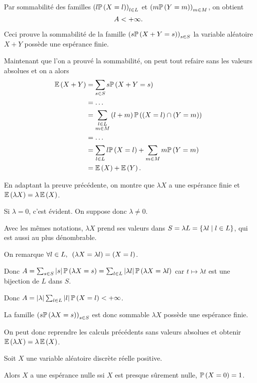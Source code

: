 \begin{dem}
Par sommabilité des familles \(\left(l\mathbb{P}\left(X=l\right)\right)_{l\in L}\) et \(\left(m\mathbb{P}\left(Y=m\right)\right)_{m\in M}\), on obtient \[A<+\infty.\]

Ceci prouve la sommabilité de la famille \(\left(s\mathbb{P}\left(X+Y=s\right)\right)_{s\in S}\) \ie la variable aléatoire \(X+Y\) possède une espérance finie.

Maintenant que l'on a prouvé la sommabilité, on peut tout refaire sans les valeurs absolues et on a alors \[\begin{aligned}
\operatorname{\mathbb{E}}\left(X+Y\right)&=\sum_{s\in S}s\mathbb{P}\left(X+Y=s\right) \\
&=\dots \\
&=\sum_{\substack{l\in L \\ m\in M}}\left(l+m\right)\mathbb{P}\left(\left(X=l\right)\cap\left(Y=m\right)\right) \\
&=\dots \\
&=\sum_{l\in L}l\mathbb{P}\left(X=l\right)+\sum_{m\in M}m\mathbb{P}\left(Y=m\right) \\
&=\operatorname{\mathbb{E}}\left(X\right)+\operatorname{\mathbb{E}}\left(Y\right).
\end{aligned}\]
\end{dem}

\begin{dem}
En adaptant la preuve précédente, on montre que \(\lambda X\) a une espérance finie et \(\operatorname{\mathbb{E}}\left(\lambda X\right)=\lambda\operatorname{\mathbb{E}}\left(X\right)\).

Si \(\lambda=0\), c'est évident. On suppose donc \(\lambda\not=0\).

Avec les mêmes notations, \(\lambda X\) prend ses valeurs dans \(S=\lambda L=\left\lbrace\lambda l\;\middle|\; l\in L\right\rbrace\), qui est aussi au plus dénombrable.

On remarque \(\quantifs{\forall l\in L}\paren{\lambda X=\lambda l}=\paren{X=l}\).

Donc \(A=\sum_{s\in S}\left\lvert s\right\rvert\mathbb{P}\left(\lambda X=s\right)=\sum_{l\in L}\left\lvert\lambda l\right\rvert\mathbb{P}\left(\lambda X=\lambda l\right)\) car \(t\mapsto\lambda t\) est une bijection de \(L\) dans \(S\).

Donc \(A=\left\lvert\lambda\right\rvert\sum_{l\in L}\left\lvert l\right\rvert\mathbb{P}\left(X=l\right)<+\infty\).

La famille \(\left(s\mathbb{P}\left(\lambda X=s\right)\right)_{s\in S}\) est donc sommable \ie \(\lambda X\) possède une espérance finie.

On peut donc reprendre les calculs précédents sans valeurs absolues et obtenir \(\operatorname{\mathbb{E}}\left(\lambda X\right)=\lambda\operatorname{\mathbb{E}}\left(X\right)\).
\end{dem}

\begin{prop}
Soit \(X\) une variable aléatoire discrète réelle positive.

Alors \(X\) a une espérance nulle ssi \(X\) est presque sûrement nulle, \ie \(\mathbb{P}\left(X=0\right)=1\).
\end{prop}

